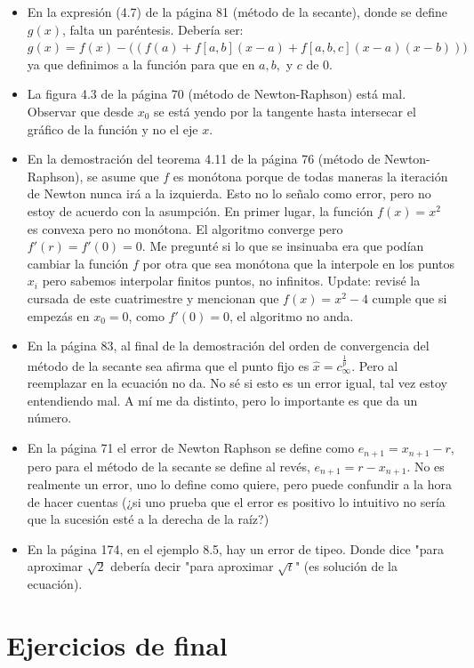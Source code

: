 \documentclass[10pt,a4paper,final]{report}
\begin{document}
{\begin{itemize}
	\item En la expresión (4.7) de la página 81 (método de la secante), donde se define $g(x)$, falta un paréntesis. Debería ser:
$g(x) = f(x) - \Bigg((f(a) + f[a,b] (x-a) + f[a,b,c] (x-a) (x-b))\Bigg)$ ya que definimos a la función para que en $a,b,$ y $c$ de $0$.
	\item La figura 4.3 de la página 70 (método de Newton-Raphson) está mal. Observar que desde $x_0$ se está yendo por la tangente hasta intersecar el gráfico de la función y no el eje $x$.
	\item En la demostración del teorema 4.11 de la página 76 (método de Newton-Raphson), se asume que $f$ es monótona porque de todas maneras la iteración de Newton nunca irá a la izquierda. Esto no lo señalo como error, pero no estoy de acuerdo con la asumpción. En primer lugar, la función $f(x) = x^2$ es convexa pero no monótona. El algoritmo converge pero $f'(r) = f'(0) = 0$. Me pregunté si lo que se insinuaba era que podían cambiar la función $f$ por otra que sea monótona que la interpole en los puntos $x_i$ pero sabemos interpolar finitos puntos, no infinitos. Update: revisé la cursada de este cuatrimestre y mencionan que $f(x) = x^2-4$ cumple que si empezás en $x_0=0$, como $f'(0)=0$, el algoritmo no anda.
	 \item En la página 83, al final de la demostración del orden de convergencia del método de la secante sea afirma que el punto fijo es $\hat{x} = c_\infty^\frac{1}{p}$. Pero al reemplazar en la ecuación no da. No sé si esto es un error igual, tal vez estoy entendiendo mal. A mí me da distinto, pero lo importante es que da un número.
	\item En la página 71 el error de Newton Raphson se define como $e_{n+1} = x_{n+1} -r$, pero para el método de la secante se define al revés, $e_{n+1} = r - x_{n+1}$. No es realmente un error, uno lo define como quiere, pero puede confundir a la hora de hacer cuentas (¿si uno prueba que el error es positivo lo intuitivo no sería que la sucesión esté a la derecha de la raíz?)
	\item En la página 174, en el ejemplo 8.5, hay un error de tipeo. Donde dice "para aproximar $\sqrt{2}$ debería decir "para aproximar $\sqrt{t}$" (es solución de la ecuación).
\end{itemize}


\section{Ejercicios de final}

}
\end{document}
